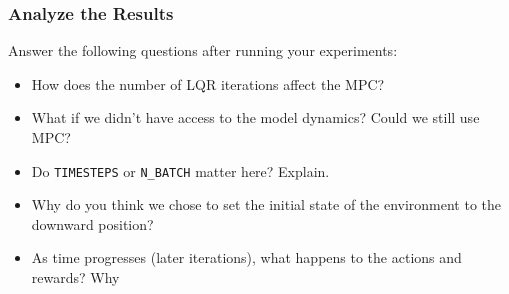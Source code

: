 \subsubsection{Analyze the Results} 
Answer the following questions after running your experiments: 
\begin{itemize} 
    \item How does the number of LQR iterations affect the MPC? 
    \item What if we didn't have access to the model dynamics? Could we still use MPC? 
    \item Do \texttt{TIMESTEPS} or \texttt{N\_BATCH} matter here? Explain. 
    \item Why do you think we chose to set the initial state of the environment to the downward position? \item As time progresses (later iterations), what happens to the actions and rewards? Why
\end{itemize}